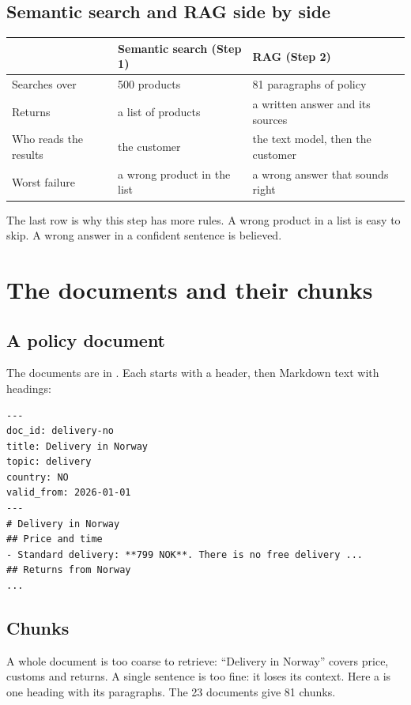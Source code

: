 \documentclass[11pt]{article}
\begin{document}
\subsection{Semantic search and RAG side by side}

\begin{table}[H]
\small
\begin{tabularx}{\textwidth}{@{}l X X@{}}
\toprule
 & Semantic search (Step 1) & RAG (Step 2) \\
\midrule
Searches over & 500 products & 81 paragraphs of policy \\
Returns & a list of products & a written answer and its sources \\
Who reads the results & the customer & the text model, then the
  customer \\
Worst failure & a wrong product in the list & a wrong answer that sounds
  right \\
\bottomrule
\end{tabularx}
\end{table}

The last row is why this step has more rules. A wrong product in a list
is easy to skip. A wrong answer in a confident sentence is believed.

\section{The documents and their chunks}

\subsection{A policy document}

The documents are in . Each starts with a header,
then Markdown text with \code{\#\#} headings:
\begin{lstlisting}
---
doc_id: delivery-no
title: Delivery in Norway
topic: delivery
country: NO
valid_from: 2026-01-01
---
# Delivery in Norway
## Price and time
- Standard delivery: **799 NOK**. There is no free delivery ...
## Returns from Norway
...
\end{lstlisting}

\subsection{Chunks}

A whole document is too coarse to retrieve: ``Delivery in Norway''
covers price, customs and returns. A single sentence is too fine: it
loses its context. Here a  is one heading with its
paragraphs. The 23 documents give 81 chunks.
\end{document}

